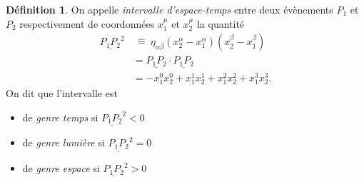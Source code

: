 \documentclass[a4paper,11pt]{report}
\theoremstyle{definition}
\theoremstyle{plain}
\theoremstyle{definition}
\newtheorem{defn}{Définition}[chapter]
\theoremstyle{remark}
\begin{document}
            \begin{defn}
                On appelle \textit{intervalle d'espace-temps} entre deux évènements $P_1$ et $P_2$ respectivement de coordonnées $x_1^\mu$ et $x_2^\mu$ la quantité
                \begin{align}
                    \underline{P_1P_2}^2&~\hat{=}~ \eta_{\alpha\beta}(x_2^\alpha-x_1^\alpha)(x_2^\beta-x_1^\beta) \\
                    &= \underline{P_1P_2}\cdot\underline{P_1P_2} \\
                    &= -x_1^0 x_2^0 + x_1^1 x_2^1 + x_1^2 x_2^2 + x_1^3 x_2^3.
                \end{align}
                $$$$
                On dit que l'intervalle est 
                \begin{itemize}[label = \textbullet]
                    \item de \textit{genre temps} si $\underline{P_1P_2}^2<0$
                    \item de \textit{genre lumière} si $\underline{P_1P_2}^2=0$
                    \item de \textit{genre espace} si $\underline{P_1P_2}^2>0$
                \end{itemize}
            \end{defn}
            
\end{document}

